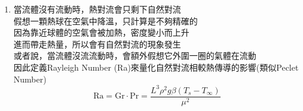 \documentclass[../main.tex]{subfiles}
\begin{document}
\begin{itemize}
\begin{itemize}
\begin{itemize}
\begin{enumerate}
          \begin{equation}
            \text{Gr} = \frac{L^3\rho^2g\beta\left(T_s-T_\infty\right)}{\mu^2} =
            \frac{\text{Buoyancy Force}}{\text{Viscous Force}}
          \end{equation}
          若只考慮，$\text{Nu}_N = f(\text{Pr},\text{Gr},\frac{L}{D})$\\
          若只考慮，$\text{Nu}_F = f(\text{Pr},\text{Re},\frac{L}{D})$\\
          因此，會將Nusselt Number分成自然對流和強制對流兩項評估:
          \begin{equation}
            \text{Nu} = \text{Nu}_N \pm \text{Nu}_F
          \end{equation}
          Richardson Number (Ri)，則量化了自然對流和強制對流的相對重要性
          \begin{equation}
            \text{Ri} = \frac{\text{Gr}}{\text{Re}^2} = \frac{\text{Buoyancy Force}}{\text{Shear Force}}
          \end{equation}
          之所以會是平方，是因為浮力大小正比於密度差，但慣性力跟剪力都是正比於速度平方\\
          或單純，只是這樣訂數量級差距能在1附近
          \begin{equation}
            \begin{cases}
              \text{Ri} \gg 1 & \text{Nu} = \text{Nu}_N \\
              \text{Ri} \ll 1 & \text{Nu} = \text{Nu}_F \\
              \text{Ri} \approx 1 & \text{Nu} = \text{Nu}_N \pm \text{Nu}_F
            \end{cases}
          \end{equation}
          \item 當流體沒有流動時，熱對流會只剩下自然對流\\
          假想一顆熱球在空氣中降溫，只計算是不夠精確的\\
          因為靠近球體的空氣會被加熱，密度變小而上升\\
          進而帶走熱量，所以會有自然對流的現象發生\\
          或者說，當流體沒流流動時，會額外假想它外圍一圈的氣體在流動\\
          因此定義Rayleigh Number (Ra)來量化自然對流相較熱傳導的影響(類似Peclet Number)
          \begin{equation}
            \text{Ra} = \text{Gr}\cdot \text{Pr} = \frac{L^3\rho^2g\beta\left(T_s-T_\infty\right)}{\mu^2}

\end{equation}
\end{enumerate}
\end{itemize}
\end{itemize}
\end{itemize}
\end{document}
